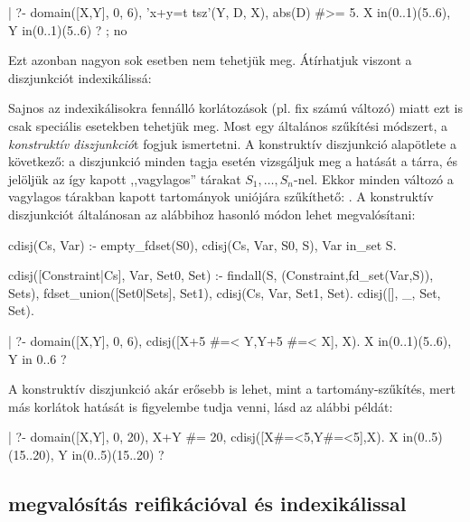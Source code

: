 \begin{prologcode}
| ?- domain([X,Y], 0, 6), 'x+y=t tsz'(Y, D, X), abs(D) #>= 5.
X in(0..1)\/(5..6), Y in(0..1)\/(5..6) ? ;
no
\end{prologcode}

Ezt azonban nagyon sok esetben nem tehetjük meg. Átírhatjuk viszont a diszjunkciót
indexikálissá:


Sajnos az indexikálisokra fennálló korlátozások (pl. fix számú változó) miatt ezt
is csak speciális esetekben tehetjük meg. Most egy általános szűkítési módszert,
a \emph{konstruktív diszjunkció}t fogjuk ismertetni.
\br
A konstruktív diszjunkció alapötlete a következő: a diszjunkció minden tagja esetén
vizsgáljuk meg a hatását a tárra, és jelöljük az így kapott ,,vagylagos'' tárakat
$S_1, \ldots, S_n$-nel. Ekkor minden változó a vagylagos tárakban kapott tartományok
uniójára szűkíthető: . A konstruktív diszjunkciót
általánosan az alábbihoz hasonló módon lehet megvalósítani:

\begin{prologcode}
cdisj(Cs, Var) :-
        empty_fdset(S0), cdisj(Cs, Var, S0, S),
        Var in_set S.

cdisj([Constraint|Cs], Var, Set0, Set) :-
        findall(S, (Constraint,fd_set(Var,S)), Sets),
        fdset_union([Set0|Sets], Set1),
        cdisj(Cs, Var, Set1, Set).
cdisj([], _, Set, Set).

| ?- domain([X,Y], 0, 6), cdisj([X+5 #=< Y,Y+5 #=< X], X).
X in(0..1)\/(5..6), Y in 0..6 ?
\end{prologcode}

A konstruktív diszjunkció akár erősebb is lehet, mint a tartomány-szűkítés, mert más
korlátok hatását is figyelembe tudja venni, lásd az alábbi példát:

\begin{prologcode}
| ?- domain([X,Y], 0, 20), X+Y #= 20, cdisj([X#=<5,Y#=<5],X).
X in(0..5)\/(15..20), Y in(0..5)\/(15..20) ?
\end{prologcode}

\subsection{\clpfd megvalósítás reifikációval és indexikálissal}

